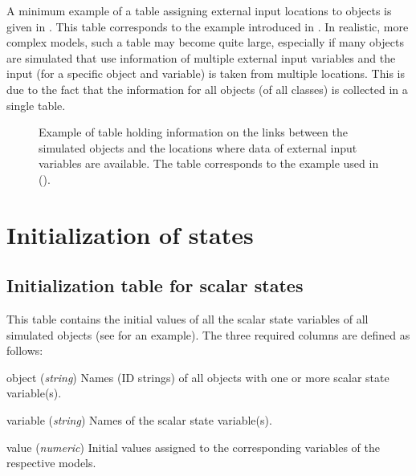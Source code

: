 A minimum example of a table assigning external input locations to objects is given in . This table corresponds to the example introduced in . In realistic, more complex models, such a table may become quite large, especially if many objects are simulated that use information of multiple external input variables and the input (for a specific object and variable) is taken from multiple locations. This is due to the fact that the information for all objects (of all classes) is collected in a single table.

\begin{figure*}[htbp]
  
  \caption[Example of table holding information on the links between the simulated objects and the locations where data of external input variables are available.]{Example of table holding information on the links between the simulated objects and the locations where data of external input variables are available. The table corresponds to the example used in  (). \label{fig:input-externalLocations}}
\end{figure*}


\FloatBarrier

\section{Initialization of states} 

\subsection{Initialization table for scalar states} \label{sec:input-initScal}

This table contains the initial values of all the scalar state variables of all simulated objects (see  for an example). The three required columns are defined as follows:

\begin{columndef}
  \item [object] (\textit{string}) Names (ID strings) of all objects with one or more scalar state variable(s).
  \item [variable] (\textit{string}) Names of the scalar state variable(s).
  \item [value] (\textit{numeric}) Initial values assigned to the corresponding variables of the respective models.
\end{columndef}

